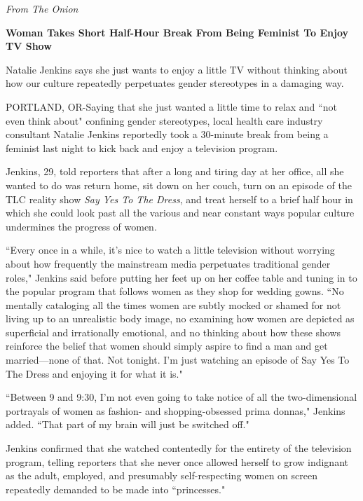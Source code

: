 \documentclass[12pt]{book}
\renewcommand{\indent}{\hspace{1cm}}
\begin{document}
\bigskip
\textit{From The Onion}
\begin{center}
\textbf{Woman Takes Short Half-Hour Break From Being Feminist To Enjoy TV Show}
\end{center}

\begin{linenumbers*}
\modulolinenumbers[5]
\indent Natalie Jenkins says she just wants to enjoy a little TV without thinking about how our culture repeatedly perpetuates gender stereotypes in a damaging way.

\bigskip
\indent PORTLAND, OR-Saying that she just wanted a little time to relax and ``not even think about" confining gender stereotypes, local health care industry consultant Natalie Jenkins reportedly took a 30-minute break from being a feminist last night to kick back and enjoy a television program.

\indent Jenkins, 29, told reporters that after a long and tiring day at her office, all she wanted to do was return home, sit down on her couch, turn on an episode of the TLC reality show \textit{Say Yes To The Dress}, and treat herself to a brief half hour in which she could look past all the various and near constant ways popular culture undermines the progress of women.

\indent
``Every once in a while, it's nice to watch a little television without worrying about how frequently the mainstream media perpetuates traditional gender roles," Jenkins said before putting her feet up on her coffee table and tuning in to the popular program that follows women as they shop for wedding gowns. ``No mentally cataloging all the times women are subtly mocked or shamed for not living up to an unrealistic body image, no examining how women are depicted as superficial and irrationally emotional, and no thinking about how these shows reinforce the belief that women should simply aspire to find a man and get married—none of that. Not tonight. I'm just watching an episode of Say Yes To The Dress and enjoying it for what it is."

\indent ``Between 9 and 9:30, I'm not even going to take notice of all the two-dimensional portrayals of women as fashion- and shopping-obsessed prima donnas," Jenkins added. ``That part of my brain will just be switched off."

\indent Jenkins confirmed that she watched contentedly for the entirety of the television program, telling reporters that she never once allowed herself to grow indignant as the adult, employed, and presumably self-respecting women on screen repeatedly demanded to be made into ``princesses."


\end{linenumbers*}
\end{document}
